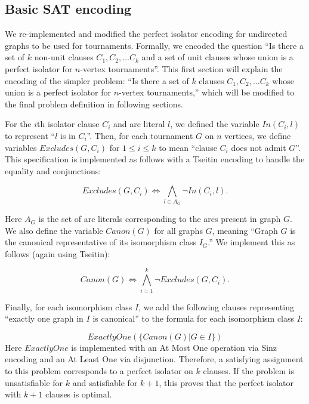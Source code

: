 \documentclass[conference]{IEEEtran}
\begin{document}
\subsection{Basic SAT encoding}

We re-implemented and modified the perfect isolator encoding for undirected graphs \cite{ref_heule} to be used for tournaments. Formally, we encoded the question ``Is there a set of $k$ non-unit clauses $C_1, C_2, ... C_k$ and a set of unit clauses whose union is a perfect isolator for $n$-vertex tournaments''. This first section will explain the encoding of the simpler problem: ``Is there a set of $k$ clauses $C_1, C_2, ... C_k$ whose union is a perfect isolator for $n$-vertex tournaments,'' which will be modified to the final problem definition in following sections.

For the $i$th isolator clause $C_i$ and arc literal $l$, we defined the variable $\mathit{In}(C_i, l)$ to represent ``$l$ is in $C_i$''. Then, for each tournament $G$ on $n$ vertices, we define variables $\mathit{Excludes}(G,C_i)$ for $1 \le i \le k$ to mean ``clause $C_i$ does not admit $G$''. This specification is implemented as follows with a Tseitin encoding \cite{ref_tseitin} to handle the equality and conjunctions:

\begin{equation}
\mathit{Excludes}(G,C_i) \Leftrightarrow \bigwedge\limits_{l \in A_G}\lnot \mathit{In}(C_i, l).
\end{equation}

\noindent Here $A_G$ is the set of arc literals corresponding to the arcs present in graph $G$. We also define the variable $\mathit{Canon}(G)$ for all graphs $G$, meaning ``Graph $G$ is the canonical representative of its isomorphism class $I_G$.'' We implement this as follows (again using Tseitin):

\begin{equation}
    \mathit{Canon}(G) \Leftrightarrow \bigwedge\limits_{i=1}^k \lnot \mathit{Excludes}(G,C_i).
\end{equation}

Finally, for each isomorphism class $I$, we add the following clauses representing ``exactly one graph in $I$ is canonical'' to the formula for each isomorphism class $I$:

\begin{equation}
 \mathit{ExactlyOne}(\{\mathit{Canon}(G) | G \in I\})
 \label{eq:perfisoform}
\end{equation}
\noindent Here $\mathit{ExactlyOne}$ is implemented with an At Most One operation via Sinz encoding \cite{ref_sinz} and an At Least One via disjunction. Therefore, a satisfying assignment to this problem corresponds to a perfect isolator on $k$ clauses. If the problem is unsatisfiable for $k$ and satisfiable for $k+1$, this proves that the perfect isolator with $k+1$ clauses is optimal.
\end{document}
